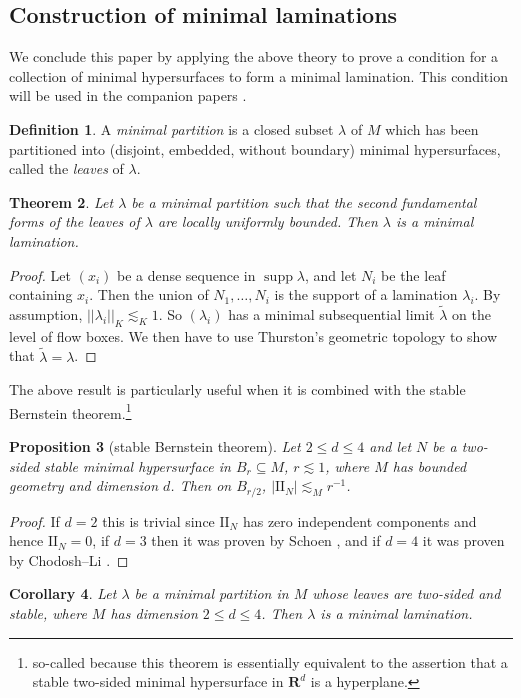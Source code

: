 \documentclass[reqno,10pt]{amsart}
\newcommand{\RR}{\mathbf{R}}
\DeclareMathOperator{\supp}{supp}
\newcommand{\Two}{\mathrm{I\!I}}
\newcommand{\dfn}[1]{\emph{#1}\index{#1}}
\newtheorem{theorem}{Theorem}[section]
\newtheorem{proposition}[theorem]{Proposition}
\newtheorem{corollary}[theorem]{Corollary}
\theoremstyle{definition}
\newtheorem{definition}[theorem]{Definition}
\numberwithin{equation}{section}
\begin{document}

\subsection{Construction of minimal laminations}
We conclude this paper by applying the above theory to prove a condition for a collection of minimal hypersurfaces to form a minimal lamination.
This condition will be used in the companion papers \cite{BackusFLG, DaskalopoulosPrep2}.

\begin{definition}
A \dfn{minimal partition} is a closed subset $\lambda$ of $M$ which has been partitioned into (disjoint, embedded, without boundary) minimal hypersurfaces, called the \dfn{leaves} of $\lambda$.
\end{definition}

\begin{theorem}
Let $\lambda$ be a minimal partition such that the second fundamental forms of the leaves of $\lambda$ are locally uniformly bounded.
Then $\lambda$ is a minimal lamination.
\end{theorem}
\begin{proof}
Let $(x_i)$ be a dense sequence in $\supp \lambda$, and let $N_i$ be the leaf containing $x_i$.
Then the union of $N_1, \dots, N_i$ is the support of a lamination $\lambda_i$.
By assumption, $||\lambda_i||_K \lesssim_K 1$.
So $(\lambda_i)$ has a minimal subsequential limit $\tilde \lambda$ on the level of flow boxes.
We then have to use Thurston's geometric topology to show that $\tilde \lambda = \lambda$.
\end{proof}

The above result is particularly useful when it is combined with the stable Bernstein theorem.\footnote{so-called because this theorem is essentially equivalent to the assertion that a stable two-sided minimal hypersurface in $\RR^d$ is a hyperplane.}

\begin{proposition}[stable Bernstein theorem]
Let $2 \leq d \leq 4$ and let $N$ be a two-sided stable minimal hypersurface in $B_r \subseteq M$, $r \lesssim 1$, where $M$ has bounded geometry and dimension $d$.
Then on $B_{r/2}$, $|\Two_N| \lesssim_M r^{-1}$.
\end{proposition}
\begin{proof}
If $d = 2$ this is trivial since $\Two_N$ has zero independent components and hence $\Two_N = 0$, if $d = 3$ then it was proven by Schoen \cite[Corollary 2.11]{colding2011course}, and if $d = 4$ it was proven by Chodosh--Li \cite{Chodosh2021}.
\end{proof}

\begin{corollary}
Let $\lambda$ be a minimal partition in $M$ whose leaves are two-sided and stable, where $M$ has dimension $2 \leq d \leq 4$.
Then $\lambda$ is a minimal lamination.
\end{corollary}


\printbibliography
\end{document}
